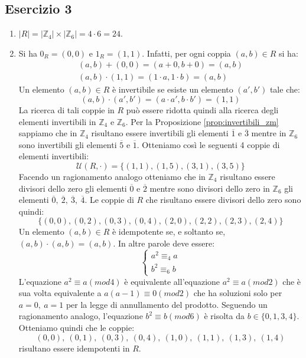 \subsection*{Esercizio 3}
\begin{enumerate}[label=(\textit{\roman*})]
	\item $|R| = |\mathbb{Z}_{4}| \times |\mathbb{Z}_{6}| = 4 \cdot 6 = 24$.
	\item Si ha $0_{R}=(0,0)$ e $1_{R}=(1,1)$. Infatti, per ogni coppia $(a,b) \in R$ si ha:
	\begin{align*}
		(a,b)+(0,0) =(a+0,b+0)=(a,b) \\
		(a,b)\cdot(1,1)=(1\cdot a, 1 \cdot b) = (a,b)
	\end{align*}
	Un elemento $(a,b) \in R$ è invertibile se esiste un elemento $(a',b')$ tale che:
	\begin{displaymath}
		(a,b) \cdot (a',b') = (a \cdot a', b \cdot b') = (1,1)
	\end{displaymath}
	La ricerca di tali coppie in $R$ può essere ridotta quindi alla ricerca degli elementi invertibili in $\mathbb{Z}_{4}$ e $\mathbb{Z}_{6}$. Per la Proposizione \ref{prop:invertibili_zm} sappiamo che in $\mathbb{Z}_{4}$ risultano essere invertibili gli elementi $\overline{1}$ e $\overline{3}$ mentre in $\mathbb{Z}_{6}$ sono invertibili gli elementi $\overline{5}$ e $\overline{1}$. Otteniamo così le seguenti 4 coppie di elementi invertibili:
	\begin{displaymath}
		\mathcal{U}(R,\cdot) =\{(1,1),(1,5),(3,1),(3,5)\}
	\end{displaymath}
	Facendo un ragionamento analogo otteniamo che in $\mathbb{Z}_{4}$ risultano essere divisori dello zero gli elementi $\overline{0}$ e $\overline{2}$ mentre sono divisori dello zero in $\mathbb{Z}_{6}$ gli elementi $\overline{0},\ \overline{2}, \ \overline{3}, \ \overline{4}$. Le coppie di $R$ che risultano essere divisori dello zero sono quindi:
	\begin{displaymath}
		\{(0,0),(0,2),(0,3),(0,4),(2,0),(2,2),(2,3),(2,4)\}
	\end{displaymath}
	Un elemento $(a,b) \in R$ è idempotente se, e soltanto se, $(a,b) \cdot (a,b) = (a,b)$. In altre parole deve essere:
	\begin{displaymath}
		\begin{cases}
			a^{2} \equiv_{4} a \\
			b^{2} \equiv_{6} b
		\end{cases}
	\end{displaymath}
	L'equazione $a^{2} \equiv a (mod 4)$ è equivalente all'equazione $a^{2} \equiv a (mod 2)$ che è sua volta equivalente a $a(a-1) \equiv 0 (mod 2)$ che ha soluzioni solo per $a=0, \ a= 1$ per la legge di annullamento del prodotto. Seguendo un ragionamento analogo, l'equazione $b^{2}\equiv b (mod 6)$ è risolta da $b \in \{0,1,3,4\}$. Otteniamo quindi che le coppie:$$(0,0), \ (0,1),\ (0,3),\ (0,4),\ (1,0),\ (1,1),\ (1,3), \ (1,4)$$ risultano essere idempotenti in $R$.

\end{enumerate}
